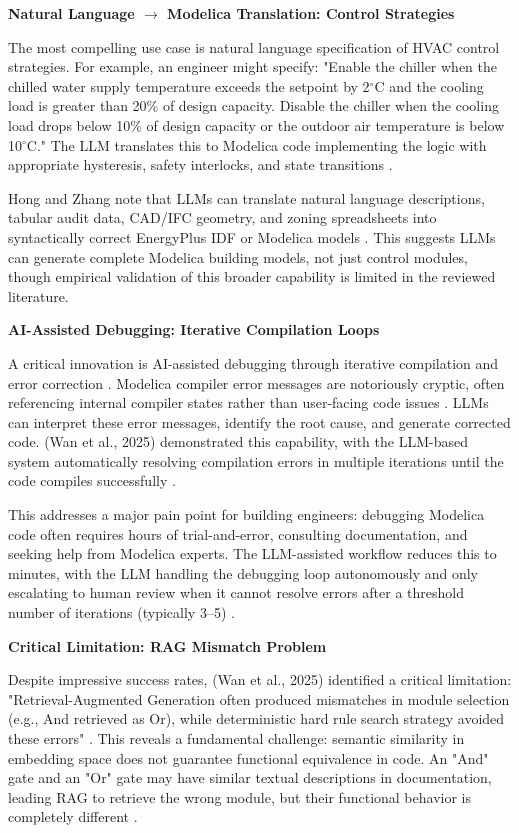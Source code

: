 \documentclass[12pt,a4paper]{article}
\begin{document}
\textbf{Natural Language $\rightarrow$ Modelica Translation: Control Strategies}

The most compelling use case is natural language specification of HVAC control strategies. For example, an engineer might specify: "Enable the chiller when the chilled water supply temperature exceeds the setpoint by 2$^\circ$C and the cooling load is greater than 20\% of design capacity. Disable the chiller when the cooling load drops below 10\% of design capacity or the outdoor air temperature is below 10$^\circ$C." The LLM translates this to Modelica code implementing the logic with appropriate hysteresis, safety interlocks, and state transitions \cite{ref96}.

Hong and Zhang note that LLMs can translate natural language descriptions, tabular audit data, CAD/IFC geometry, and zoning spreadsheets into syntactically correct EnergyPlus IDF or Modelica models \cite{ref97}. This suggests LLMs can generate complete Modelica building models, not just control modules, though empirical validation of this broader capability is limited in the reviewed literature.

\textbf{AI-Assisted Debugging: Iterative Compilation Loops}

A critical innovation is AI-assisted debugging through iterative compilation and error correction \cite{ref98}. Modelica compiler error messages are notoriously cryptic, often referencing internal compiler states rather than user-facing code issues \cite{ref99}. LLMs can interpret these error messages, identify the root cause, and generate corrected code. (Wan et al., 2025) demonstrated this capability, with the LLM-based system automatically resolving compilation errors in multiple iterations until the code compiles successfully \cite{ref100}.

This addresses a major pain point for building engineers: debugging Modelica code often requires hours of trial-and-error, consulting documentation, and seeking help from Modelica experts. The LLM-assisted workflow reduces this to minutes, with the LLM handling the debugging loop autonomously and only escalating to human review when it cannot resolve errors after a threshold number of iterations (typically 3--5) \cite{ref101}.

\textbf{Critical Limitation: RAG Mismatch Problem}

Despite impressive success rates, (Wan et al., 2025) identified a critical limitation: "Retrieval-Augmented Generation often produced mismatches in module selection (e.g., And retrieved as Or), while deterministic hard rule search strategy avoided these errors" \cite{ref102}. This reveals a fundamental challenge: semantic similarity in embedding space does not guarantee functional equivalence in code. An "And" gate and an "Or" gate may have similar textual descriptions in documentation, leading RAG to retrieve the wrong module, but their functional behavior is completely different \cite{ref103}.
\end{document}
